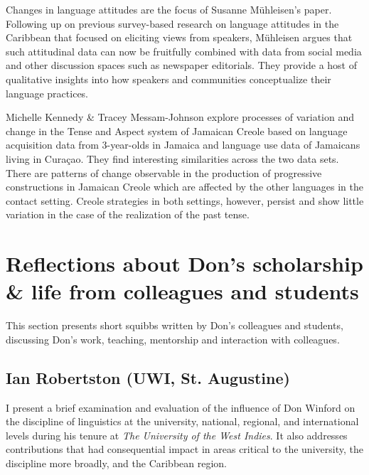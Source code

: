 \documentclass[output=paper, colorlinks,citecolor=brown]{langscibook}
\begin{document}
Changes in language attitudes are the focus of Susanne Mühleisen’s paper. Following up on previous survey-based research on language attitudes in the Caribbean that focused on eliciting views from speakers, Mühleisen argues that such attitudinal data can now be fruitfully combined with data from social media and other discussion spaces such as newspaper editorials. They provide a host of qualitative insights into how speakers and communities conceptualize their language practices. 

Michelle Kennedy \& Tracey Messam-Johnson explore processes of variation and change in the Tense and Aspect system of Jamaican Creole based on language acquisition data from 3-year-olds in Jamaica and language use data of Jamaicans living in Curaçao. They find interesting similarities across the two data sets. There are patterns of change observable in the production of progressive constructions in Jamaican Creole which are affected by the other languages in the contact setting. Creole strategies in both settings, however, persist and show little variation in the case of the realization of the past tense.

\section{Reflections about Don’s scholarship \& life from colleagues and students}

This section presents short squibbs written by Don's colleagues and students, discussing Don's work, teaching, mentorship and interaction with colleagues. 

\subsection{Ian Robertston (UWI, St. Augustine)}

I present a brief examination and evaluation of the influence of Don Winford on the discipline of linguistics at the university, national, regional, and international levels during his tenure at \textit{The University of the West Indies}. It also addresses contributions that had consequential impact in areas critical to the university, the discipline more broadly, and the Caribbean region. 
\end{document}
